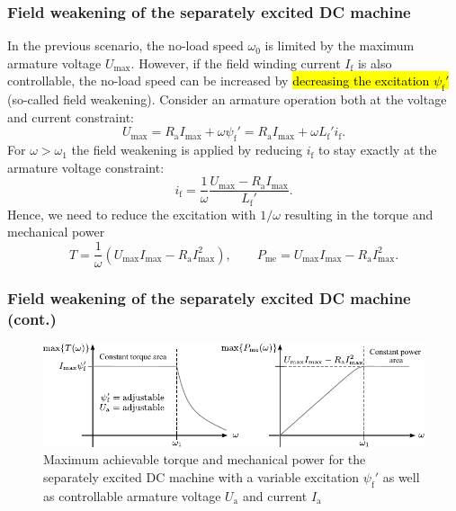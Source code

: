 \begin{frame}
	\frametitle{Field weakening of the separately excited DC machine}
			In the previous scenario, the no-load speed $\omega_0$ is limited by the maximum armature voltage $U_\mathrm{max}$. However, if the field winding current $I_\mathrm{f}$ is also controllable, the no-load speed can be increased by \hl{decreasing the excitation $\psi_\mathrm{f}'$} (so-called field weakening). \pause Consider an armature operation both at the voltage and current constraint:
			\begin{equation}
				U_\mathrm{max}  = R_\mathrm{a} I_\mathrm{max} + \omega \psi_\mathrm{f}'= R_\mathrm{a} I_\mathrm{max} + \omega L_\mathrm{f}' i_\mathrm{f}.
			\end{equation} \pause
			For $\omega > \omega_1$ the field weakening is applied by reducing $i_\mathrm{f}$ to stay exactly at the armature voltage constraint:
			\begin{equation}
				i_\mathrm{f} = \frac{1}{\omega}\frac{U_\mathrm{max} - R_\mathrm{a} I_\mathrm{max}}{L_\mathrm{f}'}.
			\end{equation} \pause
			Hence, we need to reduce the excitation with $1/\omega$ resulting in the torque and mechanical power
			\begin{equation}
				T = \frac{1}{\omega} \left(U_\mathrm{max}I_\mathrm{max} - R_\mathrm{a} I_\mathrm{max}^2\right), \qquad P_\mathrm{me} = U_\mathrm{max}I_\mathrm{max} - R_\mathrm{a} I_\mathrm{max}^2.
			\end{equation}
\end{frame}

\begin{frame}
	\frametitle{Field weakening of the separately excited DC machine (cont.)}
	\begin{figure}
		\centering
		\includegraphics[scale=1.1]{fig/lec03/Sep_DC_machine_field_weakening.pdf}
		\caption{Maximum achievable torque and mechanical power for the separately excited DC machine with a variable excitation $\psi_\mathrm{f}'$ as well as controllable armature voltage $U_\mathrm{a}$ and current $I_\mathrm{a}$}
		\label{fig:Sep_DC_machine_field_weakening}
\end{figure}
\end{frame}

